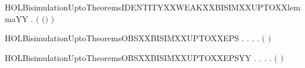 \begin{SaveVerbatim}{HOLBisimulationUptoTheoremsIDENTITYXXWEAKXXBISIMXXUPTOXXlemmaYY}
\HOLTokenTurnstile{} \HOLSymConst{\HOLTokenForall{}}. \ensuremath{(}  \ensuremath{(}\HOLSymConst{\ensuremath{=}}\ensuremath{)}  \ensuremath{)}  
\end{SaveVerbatim}
\newcommand{\HOLBisimulationUptoTheoremsIDENTITYXXWEAKXXBISIMXXUPTOXXlemmaYY}{\UseVerbatim{HOLBisimulationUptoTheoremsIDENTITYXXWEAKXXBISIMXXUPTOXXlemmaYY}}
\begin{SaveVerbatim}{HOLBisimulationUptoTheoremsOBSXXBISIMXXUPTOXXEPS}
\HOLTokenTurnstile{} \HOLSymConst{\HOLTokenForall{}}.
         \HOLSymConst{\HOLTokenImp{}}
       \HOLSymConst{\HOLTokenForall{}} .
              \HOLSymConst{\HOLTokenImp{}}
           \HOLSymConst{\HOLTokenForall{}}.
                  \HOLSymConst{\HOLTokenImp{}}
               \HOLSymConst{\HOLTokenExists{}}.
                      \HOLSymConst{\HOLTokenConj{}}
                   \ensuremath{(}    \ensuremath{)}  
\end{SaveVerbatim}
\newcommand{\HOLBisimulationUptoTheoremsOBSXXBISIMXXUPTOXXEPS}{\UseVerbatim{HOLBisimulationUptoTheoremsOBSXXBISIMXXUPTOXXEPS}}
\begin{SaveVerbatim}{HOLBisimulationUptoTheoremsOBSXXBISIMXXUPTOXXEPSYY}
\HOLTokenTurnstile{} \HOLSymConst{\HOLTokenForall{}}.
         \HOLSymConst{\HOLTokenImp{}}
       \HOLSymConst{\HOLTokenForall{}} .
              \HOLSymConst{\HOLTokenImp{}}
           \HOLSymConst{\HOLTokenForall{}}.
                  \HOLSymConst{\HOLTokenImp{}}
               \HOLSymConst{\HOLTokenExists{}}.
                      \HOLSymConst{\HOLTokenConj{}}
                   \ensuremath{(}    \ensuremath{)}  
\end{SaveVerbatim}
